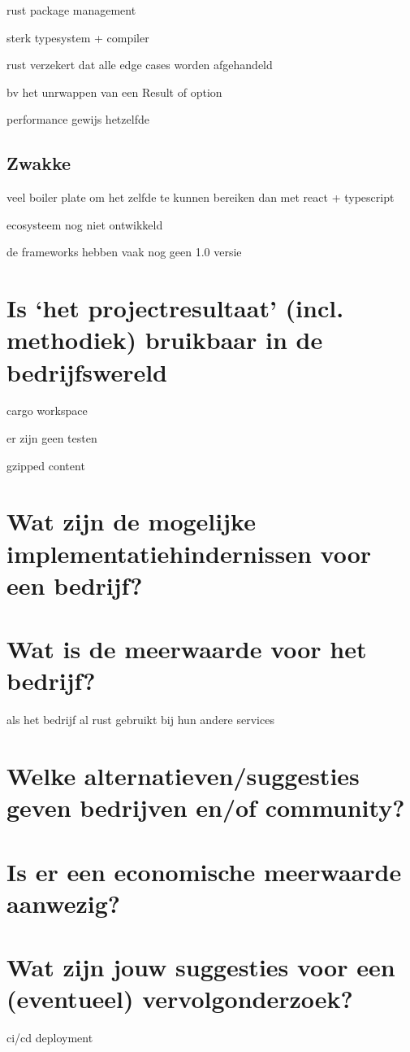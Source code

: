 rust package management

sterk typesystem + compiler

rust verzekert dat alle edge cases worden afgehandeld

bv het unrwappen van een Result of option


performance gewijs hetzelfde


\subsection{Zwakke}

veel boiler plate om het zelfde te kunnen bereiken dan met react + typescript

ecosysteem nog niet ontwikkeld

de frameworks hebben vaak nog geen 1.0 versie


\section{Is ‘het projectresultaat’ (incl. methodiek) bruikbaar in de bedrijfswereld}

cargo workspace

er zijn geen testen

gzipped content


\section{Wat zijn de mogelijke implementatiehindernissen voor een bedrijf?}




\section{Wat is de meerwaarde voor het bedrijf?}

als het bedrijf al rust gebruikt bij hun andere services


\section{Welke alternatieven/suggesties geven bedrijven en/of community?}


\section{Is er een economische meerwaarde aanwezig?}


\section{Wat zijn jouw suggesties voor een (eventueel) vervolgonderzoek?}

ci/cd deployment

